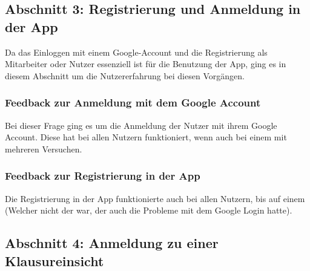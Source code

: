     \subsection{Abschnitt 3: Registrierung und Anmeldung in der App}

        Da das Einloggen mit einem Google-Account und die Registrierung als Mitarbeiter oder Nutzer essenziell ist für die Benutzung der App, ging es in diesem Abschnitt um die Nutzererfahrung bei diesen Vorgängen.

        \subsubsection{Feedback zur Anmeldung mit dem Google Account}

            Bei dieser Frage ging es um die Anmeldung der Nutzer mit ihrem Google Account. Diese hat bei allen Nutzern funktioniert, wenn auch bei einem mit mehreren Versuchen.

            \begin{bchart} [min = 0, max = 10, step = 2]
                \bigskip
                \bigskip
                \bigskip
            \end{bchart}

        \newpage

        \subsubsection{Feedback zur Registrierung in der App}

            Die Registrierung in der App funktionierte auch bei allen Nutzern, bis auf einem (Welcher nicht der war, der auch die Probleme mit dem Google Login hatte).

            \begin{bchart} [min = 0, max = 10, step = 2]
                \bigskip
                \bigskip
                \bigskip
            \end{bchart}

    \subsection{Abschnitt 4: Anmeldung zu einer Klausureinsicht}

